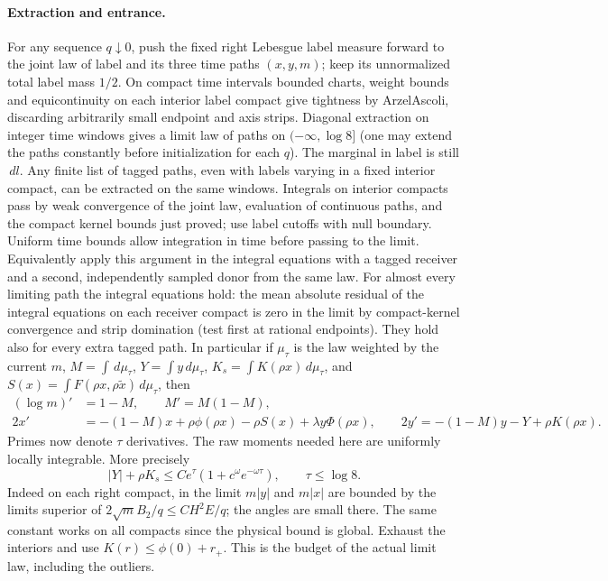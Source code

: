 \documentclass[11pt]{article}
\newcommand{\dd}{\,d}
\begin{document}
\paragraph{Extraction and entrance.}
For any sequence $q\downarrow0$, push the fixed right Lebesgue label
measure forward to the joint law of label and its three time paths
$(x,y,m)$; keep its unnormalized total label mass $1/2$.
On compact time intervals bounded charts, weight bounds and
equicontinuity on each interior label compact give tightness by
Arzel\textendash Ascoli, discarding arbitrarily small endpoint and axis
strips. Diagonal extraction on integer time windows gives a limit
law of paths on $(-\infty,\log8]$ (one may extend the paths
constantly before initialization for each $q$). The marginal in
label is still $\dd l$. Any finite list of tagged paths, even with
labels varying in a fixed interior compact, can be extracted on the
same windows. Integrals on interior compacts pass by weak convergence
of the joint law, evaluation of continuous paths, and the compact
kernel bounds just proved; use label cutoffs with null boundary.
Uniform time bounds allow integration in time before passing to
the limit. Equivalently apply this argument in the integral equations
with a tagged receiver and a second, independently sampled donor
from the same law. For almost every limiting path the integral
equations hold: the mean absolute residual of the integral equations
on each receiver compact is zero in the limit by compact-kernel
convergence and strip domination (test first at rational endpoints).
They hold also for every extra tagged path.
In particular if $\mu_\tau$ is the law weighted by the current $m$,
$M=\int\dd\mu_\tau$, $Y=\int y\dd\mu_\tau$,
$K_s=\int K(\rho x)\dd\mu_\tau$, and
$S(x)=\int F(\rho x,\rho\tilde x)\dd\mu_\tau$, then
\begin{align}
 (\log m)'&=1-M,\qquad M'=M(1-M),\nonumber\\
 2x'&=-(1-M)x+\rho\phi(\rho x)-\rho S(x)+\lambda y\Phi(\rho x),
 \qquad
 2y'=-(1-M)y-Y+\rho K(\rho x). \label{an04hbdv1:field}
\end{align}
Primes now denote $\tau$ derivatives. The raw moments needed here
are uniformly locally integrable. More precisely
\begin{equation}\label{an04hbdv1:budget}
 |Y|+\rho K_s\le C e^\tau(1+c^\omega e^{-\omega\tau}),
 \qquad \tau\le\log8 .
\end{equation}
Indeed on each right compact, in the limit $m|y|$ and $m|x|$
are bounded by the limits superior of
$2\sqrt m B_2/q\le C H^2 E/q$; the angles are small there.
The same constant works on all compacts since the physical bound
is global. Exhaust the interiors and use $K(r)\le\phi(0)+r_+$.
This is the budget of the actual limit law, including the outliers.
\end{document}

